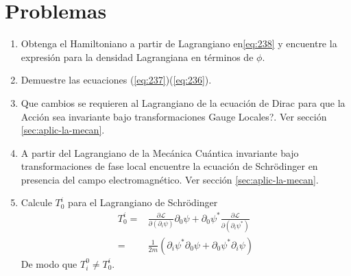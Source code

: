 \section{Problemas}
\label{sec:problemas-2}
\renewcommand{\labelenumi}{\thechapter.\theenumi} %
\begin{enumerate}
\item Obtenga el Hamiltoniano a partir de Lagrangiano en\eqref{eq:238} y encuentre la expresi\'on para la densidad Lagrangiana en t\'erminos de $\phi$.
\label{item:pch1.0} %
\item Demuestre las ecuaciones (\ref{eq:237})(\ref{eq:236}).
\label{item:pch1.1} %

\item \textquestiondown Que cambios se requieren al Lagrangiano de la ecuaci\'on de Dirac para que la Acci\'on sea invariante bajo transformaciones Gauge Locales?. Ver secci\'on \ref{sec:aplic-la-mecan}.



\label{item:pch1.3} %

\item A partir del Lagrangiano de la Mec\'anica Cu\'antica invariante bajo transformaciones de fase local encuentre la ecuaci\'on de Schr\"odinger en presencia del campo electromagn\'etico. Ver secci\'on \ref{sec:aplic-la-mecan}.
 



\item Calcule $T^i_0$ para el Lagrangiano de Schr\"odinger
  \begin{align}
    T^i_0=&\frac{\partial\mathcal{L}}{\partial(\partial_i \psi)}\partial_0\psi+\partial_0\psi^*\frac{\partial\mathcal{L}}{\partial(\partial_i \psi^*)}\nonumber\\
    =&\frac{1}{2m}\left(\partial_i\psi^*\partial_0\psi+\partial_0\psi^*\partial_i\psi \right)
  \end{align}
De modo que $T^0_i\neq T^i_0$.

\end{enumerate}


\renewcommand{\labelenumi}{\theenumi} %
